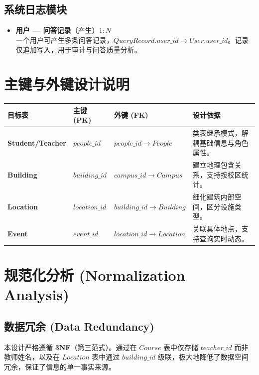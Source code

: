 \documentclass[11pt, a4paper]{article}
\begin{document}
\subsection{系统日志模块}
\begin{itemize}
    \item \textbf{用户 --- 问答记录}（产生）\quad $1{:}N$\\
    一个用户可产生多条问答记录，$QueryRecord.user\_id \rightarrow User.user\_id$。记录仅追加写入，用于审计与问答质量分析。
\end{itemize}

\vfill

\section{主键与外键设计说明}

\begin{table}[h]
\centering
\begin{tabular}{@{}llll@{}}
\toprule
\textbf{目标表} & \textbf{主键 (PK)} & \textbf{外键 (FK)} & \textbf{设计依据} \\ \midrule
\textbf{Student/Teacher} & $people\_id$ & $people\_id \rightarrow People$ & 类表继承模式，解耦基础信息与角色属性。 \\
\textbf{Building} & $building\_id$ & $campus\_id \rightarrow Campus$ & 建立地理包含关系，支持按校区统计。 \\
\textbf{Location} & $location\_id$ & $building\_id \rightarrow Building$ & 细化建筑内部空间，区分设施类型。 \\
\textbf{Event} & $event\_id$ & $location\_id \rightarrow Location$ & 关联具体地点，支持查询实时动态。 \\ \bottomrule
\end{tabular}
\end{table}

\section{规范化分析 (Normalization Analysis)}

\subsection{数据冗余 (Data Redundancy)}
本设计严格遵循 \textbf{3NF}（第三范式）。通过在 $Course$ 表中仅存储 $teacher\_id$ 而非教师姓名，以及在 $Location$ 表中通过 $building\_id$ 级联，极大地降低了数据空间冗余，保证了信息的单一事实来源。
\end{document}
